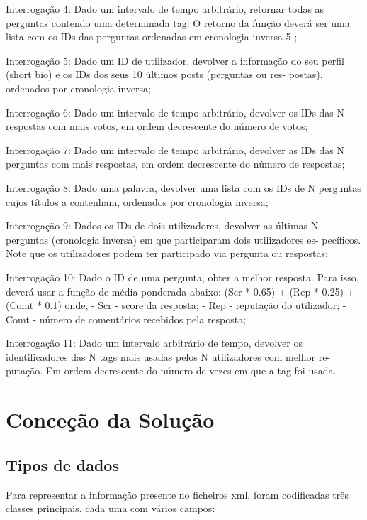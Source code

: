 \documentclass[10pt]{report}
\begin{document}
 Interrogação 4: Dado um intervalo de tempo arbitrário, retornar todas
as perguntas contendo uma determinada tag. O retorno da função deverá ser
uma lista com os IDs das perguntas ordenadas em cronologia inversa 5 ;

 Interrogação 5: Dado um ID de utilizador, devolver a informação do
seu perfil (short bio) e os IDs dos seus 10 últimos posts (perguntas ou res-
postas), ordenados por cronologia inversa;

 Interrogação 6: Dado um intervalo de tempo arbitrário, devolver os
IDs das N respostas com mais votos, em ordem decrescente do número de
votos;

 Interrogação 7: Dado um intervalo de tempo arbitrário, devolver as
IDs das N perguntas com mais respostas, em ordem decrescente do número de
respostas;

 Interrogação 8: Dado uma palavra, devolver uma lista com os IDs de
N perguntas cujos títulos a contenham, ordenados por cronologia inversa;

 Interrogação 9: Dados os IDs de dois utilizadores, devolver as últimas
N perguntas (cronologia inversa) em que participaram dois utilizadores es-
pecíficos. Note que os utilizadores podem ter participado via pergunta ou
respostas;

 Interrogação 10: Dado o ID de uma pergunta, obter a melhor resposta.
Para isso, deverá usar a função de média ponderada abaixo:
(Scr * 0.65) + (Rep * 0.25) + (Comt * 0.1)
onde,
- Scr - score da resposta;
- Rep - reputação do utilizador;
- Comt - número de comentários recebidos pela resposta;

 Interrogação 11: Dado um intervalo arbitrário de tempo, devolver os
identificadores das N tags mais usadas pelos N utilizadores com melhor re-
putação. Em ordem decrescente do número de vezes em que a tag foi usada.

\chapter{Conceção da Solução}

\section{Tipos de dados}

Para representar a informação presente no ficheiros xml, foram codificadas três classes principais, cada uma com vários campos:
\end{document}
